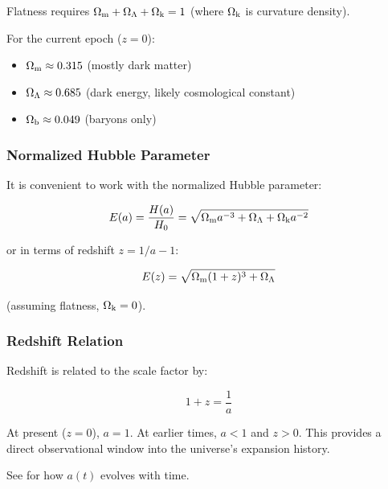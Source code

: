 Flatness requires $\Omega_{\mathrm{m}} + \Omega_{\Lambda} + \Omega_{\mathrm{k}} = 1$ (where $\Omega_{\mathrm{k}}$ is curvature density).

For the current epoch ($z=0$):
\begin{itemize}
    \item $\Omega_{\mathrm{m}} \approx 0.315$ (mostly dark matter)
    \item $\Omega_{\Lambda} \approx 0.685$ (dark energy, likely cosmological constant)
    \item $\Omega_{\mathrm{b}} \approx 0.049$ (baryons only)
\end{itemize}

\subsubsection{Normalized Hubble Parameter}

It is convenient to work with the normalized Hubble parameter:

\begin{equation}
E(a) = \frac{H(a)}{H_0} = \sqrt{\Omega_{\mathrm{m}} a^{-3} + \Omega_{\Lambda} + \Omega_{\mathrm{k}} a^{-2}}
\end{equation}

or in terms of redshift $z = 1/a - 1$:

\begin{equation}
E(z) = \sqrt{\Omega_{\mathrm{m}} (1+z)^3 + \Omega_{\Lambda}}
\label{eq:Hz_standard}
\end{equation}

(assuming flatness, $\Omega_{\mathrm{k}}=0$).


\subsubsection{Redshift Relation}

Redshift is related to the scale factor by:

\begin{equation}
1 + z = \frac{1}{a}
\end{equation}

At present ($z=0$), $a=1$. At earlier times, $a < 1$ and $z > 0$. This provides a direct observational window into the universe's expansion history.

See  for how $a(t)$ evolves with time.
